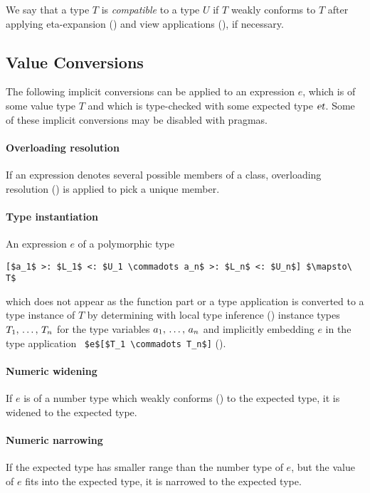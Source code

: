 We say that a type $T$ is {\em compatible} to a type $U$ if $T$ weakly conforms to $T$ after applying eta-expansion () and view applications (), if necessary.






\subsection{Value Conversions}
\label{sec:value-conversions}

The following implicit conversions can be applied to an expression $e$, which is of some value type $T$ and which is type-checked with some expected type $\mbox{\sl et}$. Some of these implicit conversions may be disabled with pragmas.

\paragraph{Overloading resolution}
If an expression denotes several possible members of a class, overloading resolution () is applied to pick a unique member. 

\paragraph{Type instantiation}
An expression $e$ of a polymorphic type
\begin{lstlisting}
[$a_1$ >: $L_1$ <: $U_1 \commadots a_n$ >: $L_n$ <: $U_n$] $\mapsto\ T$
\end{lstlisting}
which does not appear as the function part or a type application is converted to a type instance of $T$ by determining with local type inference () instance types $T_1 ,\, \ldots ,\, T_n$ for the type variables $a_1 ,\, \ldots ,\, a_n$ and implicitly embedding $e$ in the type application ~\lstinline!$e$[$T_1 \commadots T_n$]! (). 

\paragraph{Numeric widening}
If $e$ is of a number type which weakly conforms () to the expected type, it is widened to the expected type. 

\paragraph{Numeric narrowing}
If the expected type has smaller range than the number type of $e$, but the value of $e$ fits into the expected type, it is narrowed to the expected type. 

